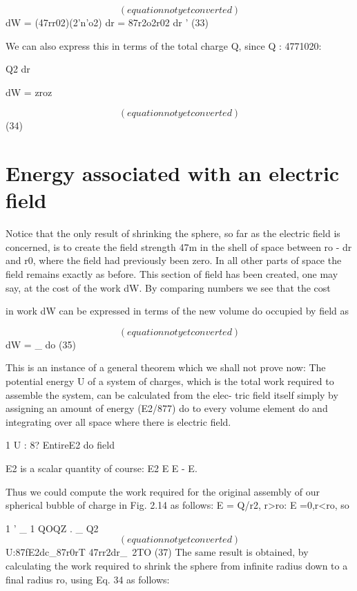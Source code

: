 \begin{equation}
(equation not yet converted)
\end{equation}
dW = (47rr02)(2'n'o2) dr = 87r2o2r02 dr ' (33)

We can also express this in terms of the total charge Q, since
Q : 4771020:

Q2 dr

dW = zroz

\begin{equation}
(equation not yet converted)
\end{equation}
(34)

\section{Energy associated with an electric field}

Notice that the only result of shrinking the sphere, so far as the
electric field is concerned, is to create the field strength 47m in the
shell of space between ro - dr and r0, where the field had previously
been zero. In all other parts of space the field remains exactly as
before. This section of field has been created, one may say, at the
cost of the work dW. By comparing numbers we see that the cost

in work dW can be expressed in terms of the new volume do occupied
by field as

\begin{equation}
(equation not yet converted)
\end{equation}
dW = _ do (35)

This is an instance of a general theorem which we shall not prove
now: The potential energy U of a system of charges, which is the total
work required to assemble the system, can be calculated from the elec-
tric field itself simply by assigning an amount of energy (E2/877) do to
every volume element do and integrating over all space where there
is electric field.

1
U : 8? EntireE2 do 
field

E2 is a scalar quantity of course: E2 E E - E.

Thus we could compute the work required for the original assembly
of our spherical bubble of charge in Fig. 2.14 as follows: E = Q/r2,
r>ro: E =0,r<ro, so

1 ' _ 1 QOQZ . _ Q2
\begin{equation}
(equation not yet converted)
\end{equation}
U:87fE2dc_87r0rT 47rr2dr_~2TO (37)
The same result is obtained, by calculating the work required to
shrink the sphere from infinite radius down to a final radius ro, using
Eq. 34 as follows:

